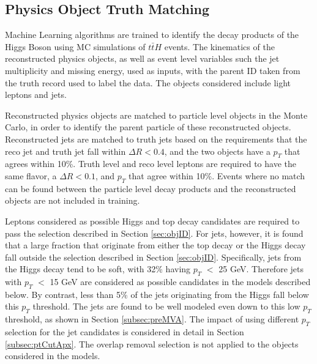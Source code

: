 \subsection{Physics Object Truth Matching}
\label{sec:truthLevelReco}

Machine Learning algorithms are trained to identify the decay products of the Higgs Boson using MC simulations of $t\bar{t}H$ events. The kinematics of the reconstructed physics objects, as well as event level variables such the jet multiplicity and missing energy, used as inputs, with the parent ID taken from the truth record used to label the data. The objects considered include light leptons and jets. 

Reconstructed physics objects are matched to particle level objects in the Monte Carlo, in order to identify the parent particle of these reconstructed objects. Reconstructed jets are matched to truth jets based on the requirements that the reco jet and truth jet fall within $\Delta R < 0.4$, and the two objects have a $p_T$ that agrees within 10\%. Truth level and reco level leptons are required to have the same flavor, a $\Delta R < 0.1$, and $p_T$ that agree within 10\%. Events where no match can be found between the particle level decay products and the reconstructed objects are not included in training.


Leptons considered as possible Higgs and top decay candidates are required to pass the selection described in Section \ref{sec:objID}. For jets, however, it is found that a large fraction that originate from either the top decay or the Higgs decay fall outside the selection described in Section \ref{sec:objID}. Specifically, jets from the Higgs decay tend to be soft, with 32\% having $p_T$ $<$ 25 GeV. Therefore jets with $p_T$ $<$ 15 GeV are considered as possible candidates in the models described below. By contrast, less than 5\% of the jets originating from the Higgs fall below this $p_T$ threshold. The jets are found to be well modeled even down to this low $p_T$ threshold, as shown in Section \ref{subsec:preMVA}. The impact of using different $p_T$ selection for the jet candidates is considered in detail in Section \ref{subsec:ptCutApx}. The overlap removal selection is not applied to the objects considered in the models.

